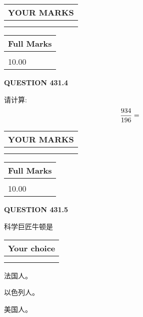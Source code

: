 \documentclass{ctexart}
\begin{document}
\noindent\begin{tabular}{|l|}
\hline
 YOUR MARKS  \\
\hline
 \\ 
 \\ 
\hline
\end{tabular}
\hspace{0.05in} \begin{tabular}{|l|}
\hline
 Full Marks  \\
\hline
 \\ 
10.00 \\
\hline
\end{tabular}
{\textbf{\Large{QUESTION
431.4 
}}}
  
  
 
请计算:
\begin{equation}
\frac { %
934 }  {  %
196} = \nonumber
\end{equation}
 

 

 
  
\vspace{0.2in}
  
\noindent\begin{tabular}{|l|}
\hline
 YOUR MARKS  \\
\hline
 \\ 
 \\ 
\hline
\end{tabular}
\hspace{0.05in} \begin{tabular}{|l|}
\hline
 Full Marks  \\
\hline
 \\ 
10.00 \\
\hline
\end{tabular}
{\textbf{\Large{QUESTION
431.5 
}}}
  
  
科学巨匠牛顿是
  
  
\noindent\hspace{3.0in} \begin{tabular}{|l|}
\hline
Your choice \\
\hline
 \\ 
 \\ 
\hline
\end{tabular}
  
  
 
 
法国人。
 
 
以色列人。
 
 
美国人。
 
\end{document}
